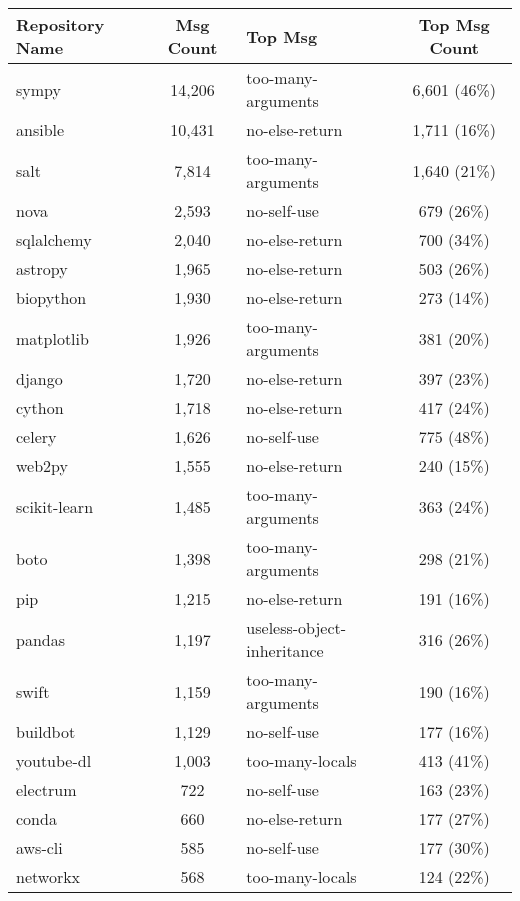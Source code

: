 \begin{table}[ht]
  \scriptsize
  \centering
  \begin{tabularx}{1.0\textwidth} {
    | l 
    | c
    | >{\centering\arraybackslash}X 
    | c |
  }
    \hline
    Repository Name & Msg Count & Top Msg & Top Msg Count \\
    \hline\hline
    sympy & 14,206 & too-many-arguments & 6,601 (46\%) \\ \hline
    ansible & 10,431 & no-else-return & 1,711 (16\%) \\ \hline
    salt & 7,814 & too-many-arguments & 1,640 (21\%) \\ \hline
    nova & 2,593 & no-self-use & 679 (26\%) \\ \hline
    sqlalchemy & 2,040 & no-else-return & 700 (34\%) \\ \hline
    astropy & 1,965 & no-else-return & 503 (26\%) \\ \hline
    biopython & 1,930 & no-else-return & 273 (14\%) \\ \hline
    matplotlib & 1,926 & too-many-arguments & 381 (20\%) \\ \hline
    django & 1,720 & no-else-return & 397 (23\%) \\ \hline
    cython & 1,718 & no-else-return & 417 (24\%) \\ \hline
    celery & 1,626 & no-self-use & 775 (48\%) \\ \hline
    web2py & 1,555 & no-else-return & 240 (15\%) \\ \hline
    scikit-learn & 1,485 & too-many-arguments & 363 (24\%) \\ \hline
    boto & 1,398 & too-many-arguments & 298 (21\%) \\ \hline
    pip & 1,215 & no-else-return & 191 (16\%) \\ \hline
    pandas & 1,197 & useless-object-inheritance & 316 (26\%) \\ \hline
    swift & 1,159 & too-many-arguments & 190 (16\%) \\ \hline
    buildbot & 1,129 & no-self-use & 177 (16\%) \\ \hline
    youtube-dl & 1,003 & too-many-locals & 413 (41\%) \\ \hline
    electrum & 722 & no-self-use & 163 (23\%) \\ \hline
    conda & 660 & no-else-return & 177 (27\%) \\ \hline
    aws-cli & 585 & no-self-use & 177 (30\%) \\ \hline
    networkx & 568 & too-many-locals & 124 (22\%) \\ \hline

\end{tabularx}
\end{table}
